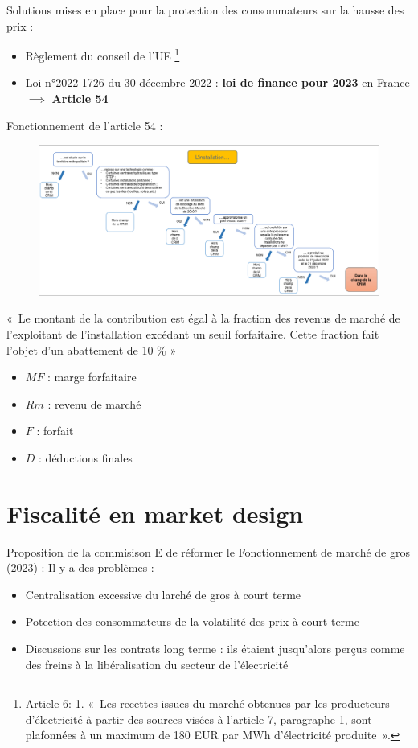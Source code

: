 Solutions mises en place pour la protection des consommateurs sur la hausse des prix :
\begin{itemize}
    \item Règlement du conseil de l'UE \footnote{Article 6: 1. « Les recettes issues du marché obtenues par les producteurs d’électricité à partir des sources visées à l’article 7, paragraphe 1, sont plafonnées à un maximum de 180 EUR par MWh d’électricité produite ».}
    \item Loi n°2022-1726 du 30 décembre 2022 : \textbf{loi de finance pour 2023} en France $\implies$ \textbf{Article 54} \newline
\end{itemize}
Fonctionnement de l'article 54 : 
\begin{figure}[hbt!]
    \centering
    \includegraphics[scale=0.3]{Pics/principe_art_54.png}
\end{figure}
\newpage
« Le montant de la contribution est égal à la fraction des revenus de marché de l'exploitant de l'installation excédant un seuil forfaitaire. Cette fraction fait l'objet d'un abattement de 10 \% »
\begin{center}
    \Large{}
\end{center}
\begin{itemize}
    \item $MF$ : marge forfaitaire
    \item $Rm$ : revenu de marché
    \item $F$ : forfait
    \item $D$ : déductions finales
\end{itemize}
\section{Fiscalité en market design}
Proposition de la commisison E de réformer le Fonctionnement de marché de gros (2023) : \newline
Il y a des problèmes :
\begin{itemize}
    \item Centralisation excessive du larché de gros à court terme
    \item Potection des consommateurs de la volatilité des prix à court terme
    \item Discussions sur les contrats long terme : ils étaient jusqu'alors perçus comme des freins à la libéralisation du secteur de l'électricité
\end{itemize}
\newpage
